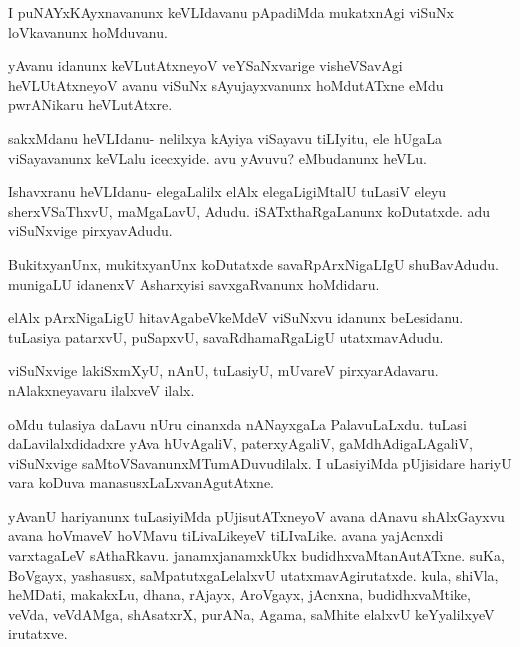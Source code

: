 \documentclass{article}
\begin{document}
\begin{mng}%
I puNAYxKAyxnavanunx keVLIdavanu pApadiMda mukatxnAgi viSuNx 
loVkavanunx hoMduvanu.
\end{mng}

\begin{mng}%
yAvanu idanunx keVLutAtxneyoV veYSaNxvarige visheVSavAgi 
heVLUtAtxneyoV avanu viSuNx sAyujayxvanunx hoMdutATxne eMdu pwrANikaru 
heVLutAtxre.
\end{mng}

\begin{mng}%
sakxMdanu heVLIdanu- nelilxya kAyiya viSayavu tiLIyitu, ele hUgaLa 
viSayavanunx keVLalu icecxyide. avu yAvuvu? eMbudanunx heVLu.
\end{mng}

\begin{mng}%
Ishavxranu heVLIdanu- elegaLalilx elAlx elegaLigiMtalU tuLasiV eleyu 
sherxVSaThxvU, maMgaLavU, Adudu. iSATxthaRgaLanunx koDutatxde. adu 
viSuNxvige pirxyavAdudu.
\end{mng}

\begin{mng}%
BukitxyanUnx, mukitxyanUnx koDutatxde savaRpArxNigaLIgU shuBavAdudu. 
munigaLU idanenxV Asharxyisi savxgaRvanunx hoMdidaru.
\end{mng}

\begin{mng}%
elAlx pArxNigaLigU hitavAgabeVkeMdeV viSuNxvu idanunx beLesidanu. 
tuLasiya patarxvU, puSapxvU, savaRdhamaRgaLigU utatxmavAdudu.
\end{mng}

\begin{mng}%
viSuNxvige lakiSxmXyU, nAnU, tuLasiyU, mUvareV pirxyarAdavaru. 
nAlakxneyavaru ilalxveV ilalx.
\end{mng}

\begin{mng}%
oMdu tulasiya daLavu nUru cinanxda nANayxgaLa PalavuLaLxdu. tuLasi 
daLavilalxdidadxre yAva hUvAgaliV, paterxyAgaliV, gaMdhAdigaLAgaliV, 
viSuNxvige saMtoVSavanunxMTumADuvudilalx. I uLasiyiMda pUjisidare 
hariyU vara koDuva manasusxLaLxvanAgutAtxne.
\end{mng}

\begin{mng}%
yAvanU hariyanunx tuLasiyiMda pUjisutATxneyoV avana dAnavu shAlxGayxvu 
avana hoVmaveV hoVMavu tiLivaLikeyeV tiLIvaLike. avana yajAcnxdi 
varxtagaLeV sAthaRkavu. janamxjanamxkUkx budidhxvaMtanAutATxne. suKa, 
BoVgayx, yashasusx, saMpatutxgaLelalxvU utatxmavAgirutatxde. kula, 
shiVla, heMDati, makakxLu, dhana, rAjayx, AroVgayx, jAcnxna, 
budidhxvaMtike, veVda, veVdAMga, shAsatxrX, purANa, Agama, saMhite 
elalxvU keYyalilxyeV irutatxve.
\end{mng}
\end{document}
